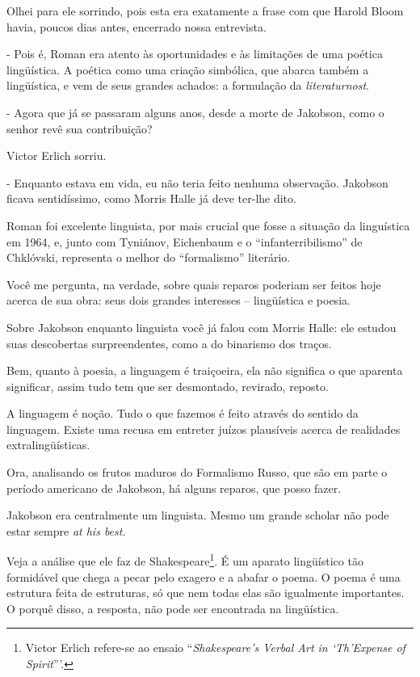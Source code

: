 Olhei para ele sorrindo, pois esta era exatamente a frase com que Harold
Bloom havia, poucos dias antes, encerrado nossa entrevista.

- Pois é, Roman era atento às oportunidades e às limitações de uma
poética lingüística. A poética como uma criação simbólica, que abarca
também a lingüística, e vem de seus grandes achados: a formulação da
\emph{literaturnost}.

- Agora que já se passaram alguns anos, desde a morte de Jakobson, como
o senhor revê sua contribuição?

Victor Erlich sorriu.

- Enquanto estava em vida, eu não teria feito nenhuma observação.
Jakobson ficava sentidíssimo, como Morris Halle já deve ter-lhe dito.

Roman foi excelente linguista, por mais crucial que fosse a situação da
linguística em 1964, e, junto com Tyniánov, Eichenbaum e o
``infanterribilismo'' de Chklóvski, representa o melhor do
``formalismo'' literário.

Você me pergunta, na verdade, sobre quais reparos poderiam ser feitos
hoje acerca de sua obra: seus dois grandes interesses -- lingüística e
poesia.

Sobre Jakobson enquanto linguista você já falou com Morris Halle: ele
estudou suas descobertas surpreendentes, como a do binarismo dos traços.

Bem, quanto à poesia, a linguagem é traiçoeira, ela não significa o que
aparenta significar, assim tudo tem que ser desmontado, revirado,
reposto.

A linguagem é noção. Tudo o que fazemos é feito através do sentido da
linguagem. Existe uma recusa em entreter juízos plausíveis acerca de
realidades extralingüísticas.

Ora, analisando os frutos maduros do Formalismo Russo, que são em parte
o período americano de Jakobson, há alguns reparos, que posso fazer.

Jakobson era centralmente um linguista. Mesmo um grande scholar não pode
estar sempre \emph{at his best}.

Veja a análise que ele faz de Shakespeare\footnote{Victor Erlich
  refere-se ao ensaio ``\emph{Shakespeare's Verbal Art in `Th'Expense of
  Spirit}'''.}. É um aparato lingüístico tão formidável que chega a
pecar pelo exagero e a abafar o poema. O poema é uma estrutura feita de
estruturas, só que nem todas elas são igualmente importantes. O porquê
disso, a resposta, não pode ser encontrada na lingüística.

